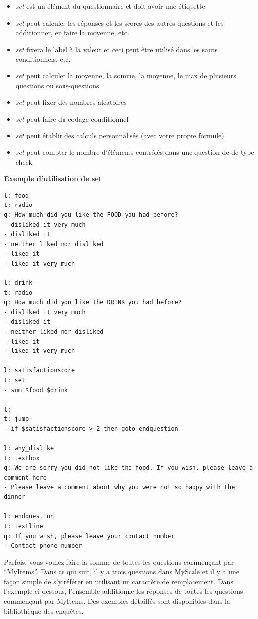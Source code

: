 \documentclass[
]{book}
\providecommand{\tightlist}{%
  \setlength{\itemsep}{0pt}\setlength{\parskip}{0pt}}
\begin{document}
\begin{itemize}
\tightlist
\item
  \emph{set} est un élément du questionnaire et doit avoir une étiquette
\item
  \emph{set} peut calculer les réponses et les scores des autres questions et les additionner, en faire la moyenne, etc.
\item
  \emph{set} fixera le label à la valeur et ceci peut être utilisé dans les sauts conditionnels, etc.
\item
  \emph{set} peut calculer la moyenne, la somme, la moyenne, le max de plusieurs questions ou sous-questions
\item
  \emph{set} peut fixer des nombres aléatoires
\item
  \emph{set} peut faire du codage conditionnel
\item
  \emph{set} peut établir des calculs personnalisés (avec votre propre formule)
\item
  \emph{set} peut compter le nombre d'éléments contrôlés dans une question de de type check
\end{itemize}

\textbf{Exemple d'utilisation de set}

\begin{verbatim}
l: food
t: radio
q: How much did you like the FOOD you had before?
- disliked it very much
- disliked it
- neither liked nor disliked
- liked it
- liked it very much

l: drink
t: radio
q: How much did you like the DRINK you had before?
- disliked it very much
- disliked it
- neither liked nor disliked
- liked it
- liked it very much

l: satisfactionscore
t: set
- sum $food $drink

l:
t: jump
- if $satisfactionscore > 2 then goto endquestion

l: why_dislike
t: textbox
q: We are sorry you did not like the food. If you wish, please leave a comment here
- Please leave a comment about why you were not so happy with the dinner

l: endquestion
t: textline
q: If you wish, please leave your contact number
- Contact phone number
\end{verbatim}

Parfois, vous voulez faire la somme de toutes les questions commençant par ``MyItems''. Dans ce qui suit, il y a trois questions dans MyScale et il y a une façon simple de s'y référer en utilisant un caractère de remplacement. Dans l'exemple ci-dessous, l'ensemble additionne les réponses de toutes les questions commençant par MyItems. Des exemples détaillés sont disponibles dans la bibliothèque des enquêtes.
\end{document}
